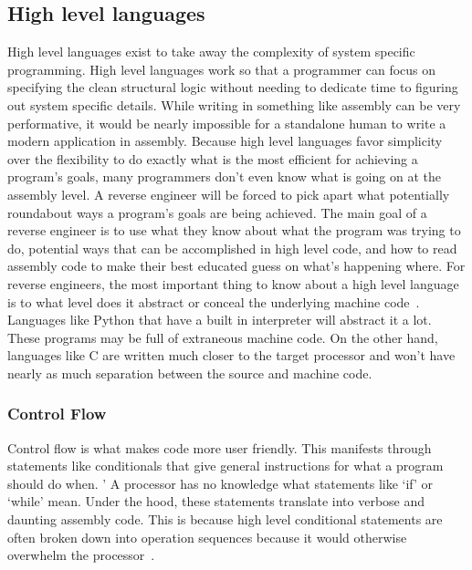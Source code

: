 \subsection{High level languages}
High level languages exist to take away the complexity of system specific programming.
High level languages work so that a programmer can focus on specifying the clean structural logic without needing to dedicate time to figuring out system specific details. 
While writing in something like assembly can be very performative, it would be nearly impossible for a standalone human to write a modern application in assembly.
Because high level languages favor simplicity over the flexibility to do exactly what is the most efficient for achieving a program’s goals, many programmers don’t even know what is going on at the assembly level. 
A reverse engineer will be forced to pick apart what potentially roundabout ways a program’s goals are being achieved. 
The main goal of a reverse engineer is to use what they know about what the program was trying to do, potential ways that can be accomplished in high level code, and how to read assembly code to make their best educated guess on what’s happening where.
For reverse engineers, the most important thing to know about a high level language is to what level does it abstract or conceal the underlying machine code~\cite{Reversing}. 
Languages like Python that have a built in interpreter will abstract it a lot. 
These programs may be full of extraneous machine code. On the other hand, languages like C are written much closer to the target processor and won’t have nearly as much separation between the source and machine code.

\subsubsection{Control Flow}
Control flow is what makes code more user friendly. 
This manifests through statements like conditionals that give general instructions for what a program should do when. '
A processor has no knowledge what statements like ‘if’ or ‘while’ mean. 
Under the hood, these statements translate into verbose and daunting assembly code. 
This is because high level conditional statements are often broken down into operation sequences because it would otherwise overwhelm the processor~\cite{Reversing}.

